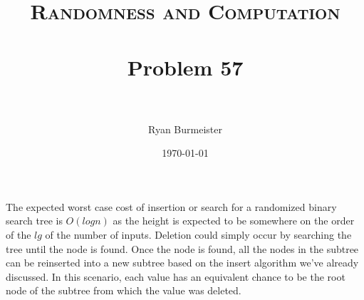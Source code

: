 \documentclass[fontsize=12pt]{article}
\title{ 
  \normalfont \normalsize 
  \textsc{Randomness and Computation} \\ [25pt] %
  \horrule{0.5pt} \\[0.4cm] %
  \huge Problem 57 \\ %
  \horrule{2pt} \\[0.5cm] %
}
\author{Ryan Burmeister} %
\date{\normalsize\today} %
\numberwithin{equation}{section} %
\numberwithin{figure}{section} %
\numberwithin{table}{section} %
\begin{document}
\maketitle %
The expected worst case cost of insertion or search for a randomized
binary search tree is $O(logn)$ as the height is expected to be somewhere
on the order of the $lg$ of the number of inputs.  Deletion could simply occur
by searching the tree until the node is found.  Once the node is found, all
the nodes in the subtree can be reinserted into a new subtree based on the
insert algorithm we've already discussed.  In this scenario, each value has
an equivalent chance to be the root node of the subtree from which the value
was deleted.

\begin{algorithm}
\begin{algorithmic}[1]
        \EndIf
    \EndWhile
        \EndFor 
    \EndIf
\end{algorithmic}
\end{algorithm}
\end{document}

